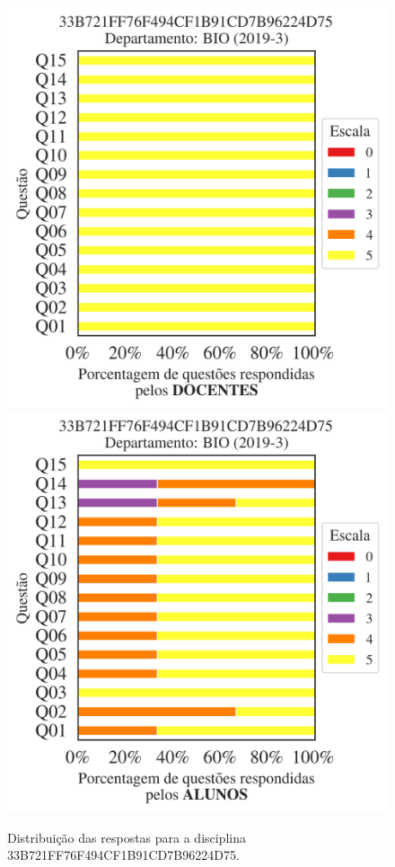 \documentclass[a4paper,10pt]{article}
\begin{document}
\begin{figure}[h]
\centering
\includegraphics[width=0.485\linewidth]{analise_disciplina_departamento_BIO_33B721FF76F494CF1B91CD7B96224D75_docentes.png}
\includegraphics[width=0.485\linewidth]{analise_disciplina_departamento_BIO_33B721FF76F494CF1B91CD7B96224D75_alunos.png}
\caption{\label{fig:analise_geral_departamento}                Distribuição das respostas para a disciplina 33B721FF76F494CF1B91CD7B96224D75. }
\end{figure}
\end{document}
